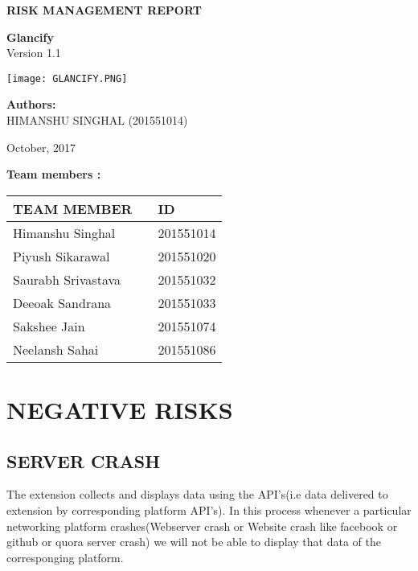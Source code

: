 \documentclass[12pt]{article}
\begin{document}
\begin{titlepage}
	\begin{center}
		        
		
		\LARGE{\textbf{RISK MANAGEMENT REPORT}}
		        
		\vspace{1.5cm}
		      
		\textbf{Glancify} \\
		\small{Version 1.1}
		
		\vspace{0.5cm}
		\texttt{[image: GLANCIFY.PNG]} \\
	
					
		\vspace{2cm}
		        
		\large{\textbf{Authors:}}\\
		\large{HIMANSHU SINGHAL (201551014)}
					
		\vspace{1.5cm}
						
		\large{October, 2017}
						
	\end{center}
\end{titlepage}
\newpage
\textbf{Team members :} \\
\begin{center}
	\begin{tabular}{ |m{10em} m{8em} m{9em}|}
		\hline
		TEAM MEMBER        &   & ID        \\
		\hline
		Himanshu Singhal             &   & 201551014 \\
		Piyush Sikarawal          &   & 201551020 \\
		Saurabh Srivastava              &   & 201551032 \\
	    Deeoak Sandrana     &   & 201551033 \\
		Sakshee Jain    &   & 201551074 \\
		Neelansh Sahai    &   & 201551086 \\ 
		\hline
	\end{tabular}
	
\end{center}
\newpage
\tableofcontents
	\newpage
\section{NEGATIVE RISKS}
\subsection{SERVER CRASH}
The extension collects and displays data using the API's(i.e data delivered to extension by corresponding platform API's). In this process whenever a particular networking platform crashes(Webserver crash or Website crash like facebook or github or quora server crash) we will not be able to display that data of the corresponging platform.  
\end{document}
